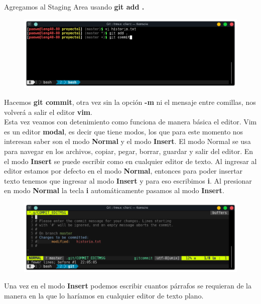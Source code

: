 \documentclass{article}
\begin{document}
Agregamos al Staging Area usando \textbf{git add .}

\begin{figure}[h!]
  \centering
  \includegraphics[scale=0.75]{./Pictures/091_add_commit.png}
\end{figure}

Hacemos \textbf{git commit}, otra vez sin la opción \textbf{-m} ni el mensaje
entre comillas, nos volverá a salir el editor \textbf{vim}.\\

Esta vez veamos con detenimiento como funciona de manera básica el editor. Vim
es un editor \textbf{modal}, es decir que tiene modos, los que para este
momento nos interesan saber son el modo \textbf{Normal} y el modo
\textbf{Insert}. El modo Normal se usa para navegar en los archivos, copiar,
pegar, borrar, guardar y salir del editor. En el modo \textbf{Insert} se puede
escribir como en cualquier editor de texto. Al ingresar al editor estamos por
defecto en el modo \textbf{Normal}, entonces para poder insertar texto tenemos
que ingresar al modo \textbf{Insert} y para eso escribimos \textbf{i}. Al
presionar en modo \textbf{Normal} la tecla \textbf{i} automáticamente pasamos
al modo \textbf{Insert}.

\begin{figure}[h!]
  \centering
  \includegraphics[scale=0.75]{./Pictures/092_mod_normal.png}
\end{figure}

Una vez en el modo \textbf{Insert} podemos escribir cuantos párrafos se
requieran de la manera en la que lo haríamos en cualquier editor de texto
plano.
\end{document}

